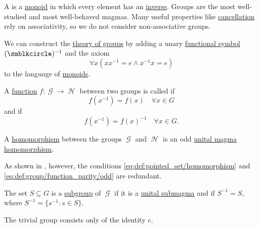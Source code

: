 \begin{definition}\label{def:group}
  A  is a \hyperref[def:unital_magma/associative]{monoid} in which every element has an \hyperref[def:unital_magma_inverse_element]{inverse}. Groups are the most well-studied and most well-behaved magmas. Many useful properties like \hyperref[thm:group_properties/cancellative]{cancellation} rely on associativity, so we do not consider non-associative groups.

  \begin{thmenum}
     We can construct the \hyperref[def:first_order_theory]{theory of groups} by adding a unary \hyperref[def:first_order_language/func]{functional symbol} \( (\placeholder)^{-1} \) and the axiom
    \begin{equation}\label{eq:def:group/theory/inverse_axiom}
      \forall x (xx^{-1} = e \wedge x^{-1}x = e)
    \end{equation}
    to the language of \hyperref[def:unital_magma/associative]{monoids}.

     A \hyperref[def:function]{function} \( f: \mscrG \to \mscrH \) between two groups is called  if
    \begin{equation}\label{eq:def:group/function_parity/even}
      f(x^{-1}) = f(x) \quad\forall x \in G
    \end{equation}
    and  if
    \begin{equation}\label{eq:def:group/function_parity/odd}
      f(x^{-1}) = f(x)^{-1} \quad\forall x \in G.
    \end{equation}

     A \hyperref[def:first_order_homomorphism]{homomorphism} between the groups \( \mscrG \) and \( \mscrH \) is an odd \hyperref[def:unital_magma/homomorphism]{unital magma homomorphism}.

    As shown in , however, the conditions \eqref{eq:def:pointed_set/homomorphism} and \eqref{eq:def:group/function_parity/odd} are redundant.

     The set \( S \subseteq G \) is a \hyperref[def:first_order_substructure]{subgroup} of \( \mscrG \) if it is a \hyperref[def:unital_magma/substructure]{unital submagma} and if \( S^{-1} = S \), where \( S^{-1} = \{ s^{-1} \colon s \in S \} \).

     The trivial group consists only of the identity \( e \).


\end{thmenum}
\end{definition}
